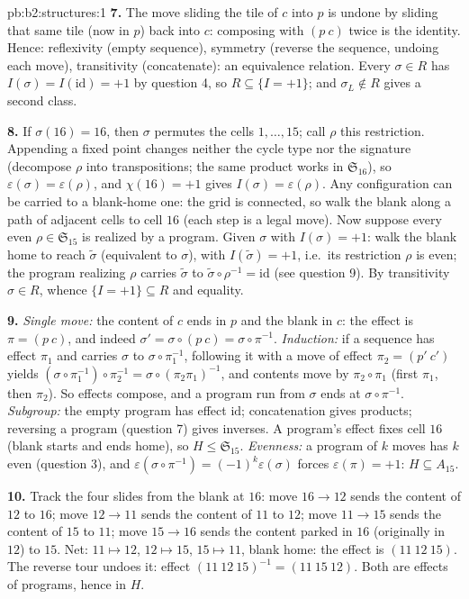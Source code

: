 \begin{solution}{pb:b2:structures:1}
\textbf{7.} The move sliding the tile of $c$ into $p$ is undone
by sliding that same tile (now in $p$) back into $c$: composing
with $(p\ c)$ twice is the identity. Hence: reflexivity (empty
sequence), symmetry (reverse the sequence, undoing each move),
transitivity (concatenate): an equivalence relation. Every
$\sigma \in R$ has $I(\sigma) = I(\mathrm{id}) = +1$ by question
4, so $R \subseteq \{I = +1\}$; and $\sigma_L \notin R$ gives a
second class.

\textbf{8.} If $\sigma(16) = 16$, then $\sigma$ permutes the
cells $1, \dots, 15$; call $\rho$ this restriction. Appending a
fixed point changes neither the cycle type nor the signature
(decompose $\rho$ into transpositions; the same product works in
$\mathfrak{S}_{16}$), so $\varepsilon(\sigma) =
\varepsilon(\rho)$, and $\chi(16) = +1$ gives $I(\sigma) =
\varepsilon(\rho)$. Any configuration can be carried to a
blank-home one: the grid is connected, so walk the blank along a
path of adjacent cells to cell $16$ (each step is a legal move).
Now suppose every even $\rho \in \mathfrak{S}_{15}$ is realized
by a program. Given $\sigma$ with $I(\sigma) = +1$: walk the
blank home to reach $\widetilde\sigma$ (equivalent to $\sigma$),
with $I(\widetilde\sigma) = +1$, i.e.\ its restriction $\rho$ is
even; the program realizing $\rho$ carries $\widetilde\sigma$ to
$\widetilde\sigma \circ \rho^{-1} = \mathrm{id}$ (see question
9). By transitivity $\sigma \in R$, whence $\{I = +1\} \subseteq
R$ and equality.

\textbf{9.} \emph{Single move:} the content of $c$ ends in $p$
and the blank in $c$: the effect is $\pi = (p\ c)$, and indeed
$\sigma' = \sigma \circ (p\ c) = \sigma \circ \pi^{-1}$.
\emph{Induction:} if a sequence has effect $\pi_1$ and carries
$\sigma$ to $\sigma \circ \pi_1^{-1}$, following it with a move
of effect $\pi_2 = (p'\ c')$ yields $(\sigma \circ \pi_1^{-1})
\circ \pi_2^{-1} = \sigma \circ (\pi_2\pi_1)^{-1}$, and contents
move by $\pi_2 \circ \pi_1$ (first $\pi_1$, then $\pi_2$). So
effects compose, and a program run from $\sigma$ ends at $\sigma
\circ \pi^{-1}$. \emph{Subgroup:} the empty program has effect
$\mathrm{id}$; concatenation gives products; reversing a program
(question 7) gives inverses. A program's effect fixes cell $16$
(blank starts and ends home), so $H \leq \mathfrak{S}_{15}$.
\emph{Evenness:} a program of $k$ moves has $k$ even (question
3), and $\varepsilon(\sigma \circ \pi^{-1}) =
(-1)^k\varepsilon(\sigma)$ forces $\varepsilon(\pi) = +1$: $H
\subseteq A_{15}$.

\textbf{10.} Track the four slides from the blank at $16$: move
$16 \to 12$ sends the content of $12$ to $16$; move $12 \to 11$
sends the content of $11$ to $12$; move $11 \to 15$ sends the
content of $15$ to $11$; move $15 \to 16$ sends the content
parked in $16$ (originally in $12$) to $15$. Net: $11 \mapsto
12$, $12 \mapsto 15$, $15 \mapsto 11$, blank home: the effect is
$(11\ 12\ 15)$. The reverse tour undoes it: effect $(11\ 12\
15)^{-1} = (11\ 15\ 12)$. Both are effects of programs, hence in
$H$.


\end{solution}
